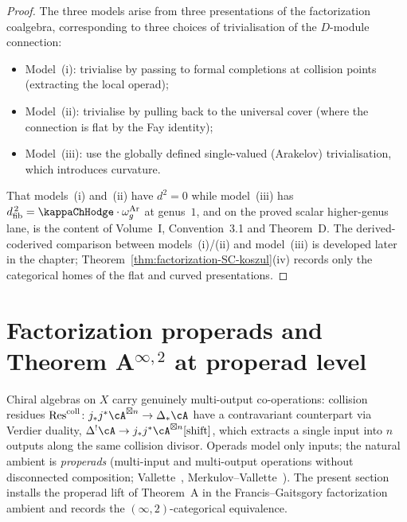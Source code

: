 \begin{proof}
The three models arise from three presentations of the factorization
coalgebra, corresponding to three choices of trivialisation of the
$D$-module connection:
\begin{itemize}
\item Model~(i): trivialise by passing to formal completions at
 collision points (extracting the local operad);
\item Model~(ii): trivialise by pulling back to the universal cover
 (where the connection is flat by the Fay identity);
\item Model~(iii): use the globally defined single-valued
 (Arakelov) trivialisation, which introduces curvature.
\end{itemize}
That models~(i) and~(ii) have $d^2 = 0$ while model~(iii)
has $\dfib^{\,2} = \kappaChHodge \cdot \omega_g^{\mathrm{Ar}}$ at genus~$1$, and on the
proved scalar higher-genus lane, is the content of
Volume~I, Convention~3.1 and Theorem~D. The derived-coderived
comparison between models~(i)/(ii) and model~(iii) is developed
later in the chapter; Theorem~\ref{thm:factorization-SC-koszul}(iv)
records only the categorical homes of the flat and curved
presentations.
\end{proof}


\section{Factorization properads and Theorem A${}^{\infty,2}$ at properad level}
\label{sec:factorization-properad}

Chiral algebras on $X$ carry genuinely multi-output co-operations:
collision residues
$\mathrm{Res}^{\mathrm{coll}}\colon j_*j^*\cA^{\boxtimes n}\to \Delta_*\cA$
have a contravariant counterpart via Verdier duality,
$\Delta^!\cA\to j_*j^*\cA^{\boxtimes n}[\text{shift}]$,
which extracts a single input into $n$ outputs along the same
collision divisor. Operads model only inputs; the natural ambient
is \emph{properads} (multi-input and multi-output operations
without disconnected composition; Vallette~\cite{Val07},
Merkulov--Vallette~\cite{MV09}). The present section installs the
properad lift of Theorem~A in the Francis--Gaitsgory factorization
ambient and records the $(\infty,2)$-categorical equivalence.

